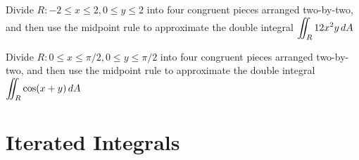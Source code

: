 \documentclass[letterpaper, twoside, 12pt]{book}
\begin{document}
          \begin{solution}

          \end{solution}

          \begin{contributors}
          \end{contributors}

          \begin{problem}
            Divide $R : -2\leq x\leq 2, 0\leq y\leq 2 $
            into four congruent pieces arranged two-by-two,
            and then use the midpoint rule to approximate the double integral
            $\displaystyle\iint_R 12x^2y\,d{A}$
          \end{problem}

          \begin{solution}

          \end{solution}

          \begin{contributors}
          \end{contributors}

          \begin{problem}
            Divide $R : 0\leq x\leq \pi/2, 0\leq y\leq \pi/2 $
            into four congruent pieces arranged two-by-two,
            and then use the midpoint rule to approximate the double integral
            $\displaystyle\iint_R \cos(x+y)\,d{A}$
          \end{problem}

          \begin{solution}

          \end{solution}

          \begin{contributors}
          \end{contributors}




\section{Iterated Integrals} %
\end{document}
